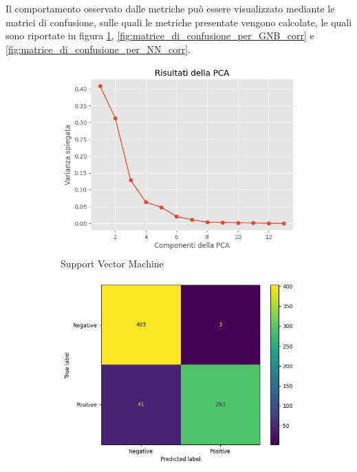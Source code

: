 Il comportamento osservato dalle metriche può essere visualizzato mediante le
matrici di confusione, sulle quali le metriche presentate vengono calcolate, le
quali sono riportate in figura \ref{fig:matrice_di_confusione_per_SVM_corr},
\ref{fig:matrice_di_confusione_per_GNB_corr} e \ref{fig:matrice_di_confusione_per_NN_corr}.
\begin{figure}[!ht]
    \centering
    \begin{subfigure}{0.45\textwidth}
        \centering
        \includegraphics[width=\textwidth]{img/analisi/pcaVarianza.png}
        \caption{Support Vector Machine}
        \label{fig:matrice_di_confusione_per_SVM_corr}
    \end{subfigure}
    \hfill
    \begin{subfigure}{.45\textwidth}
        \centering
        \includegraphics[width=\textwidth]{img/gnb/confusion_matrix_corr.png}

\end{subfigure}
\end{figure}
